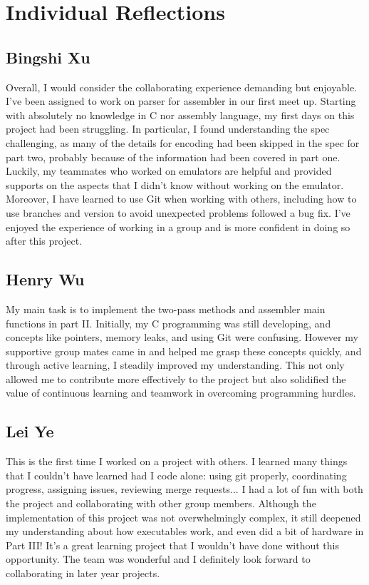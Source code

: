 \documentclass[11pt]{article}
\begin{document}
\section{Individual Reflections}

\subsection{Bingshi Xu}
Overall, I would consider the collaborating experience demanding but enjoyable.
I've been assigned to work on parser for assembler in our first meet up.
Starting with absolutely no knowledge in C nor assembly language, my first days
on this project had been struggling. In particular, I found understanding the
spec challenging, as many of the details for encoding had been skipped in the
spec for part two, probably because of the information had been covered in part
one. Luckily, my teammates who worked on emulators are helpful and provided
supports on the aspects that I didn't know without working on the emulator.
Moreover, I have learned to use Git when working with others, including how to
use branches and version to avoid unexpected problems followed a bug fix. I've
enjoyed the experience of working in a group and is more confident in doing so
after this project.

\subsection{Henry Wu}

My main task is to implement the two-pass methods and assembler main functions
in part II. Initially, my C programming was still developing, and concepts like
pointers, memory leaks, and using Git were confusing. However my supportive
group mates came in and helped me grasp these concepts quickly, and through
active learning, I steadily improved my understanding. This not only allowed me
to contribute more effectively to the project but also solidified the value of
continuous learning and teamwork in overcoming programming hurdles.

\subsection{Lei Ye}

This is the first time I worked on a project with others. I learned many things
that I couldn't have learned had I code alone: using git properly, coordinating
progress, assigning issues, reviewing merge requests... I had a lot of fun with
both the project and collaborating with other group members. Although the
implementation of this project was not overwhelmingly complex, it still
deepened my understanding about how executables work, and even did a bit of
hardware in Part III! It's a great learning project that I wouldn't have done
without this opportunity. The team was wonderful and I definitely look forward
to collaborating in later year projects.
\end{document}
